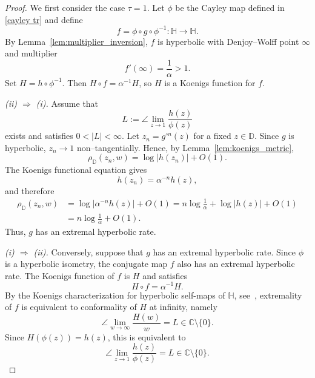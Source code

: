 \documentclass[12pt]{amsart}
\numberwithin{equation}{section}
\theoremstyle{plain}
\theoremstyle{definition}
\begin{document}
\begin{proof}
We first consider the case $\tau=1$. Let $\phi$ be the Cayley map defined in \eqref{cayley tr}
and define
\begin{equation*}
f=\phi\circ g\circ\phi^{-1}:\mathbb{H}\to\mathbb{H}.
\end{equation*}
By Lemma~\ref{lem:multiplier_inversion}, $f$ is hyperbolic with
Denjoy--Wolff point $\infty$ and multiplier
\begin{equation*}
f'(\infty)=\frac1\alpha>1.
\end{equation*}
Set
$H=h\circ\phi^{-1}.$
Then
$H\circ f=\alpha^{-1}H$,
so $H$ is a Koenigs function for $f$.

\medskip
\noindent\emph{(ii) $\Rightarrow$ (i).}
Assume that
\begin{equation*}
L:=\angle\lim_{z\to1}\frac{h(z)}{\phi(z)}
\end{equation*}
exists and satisfies $0<|L|<\infty$. Let
$z_n=g^{\circ n}(z)$ for a fixed $z\in\mathbb{D}$. Since $g$ is
hyperbolic, $z_n\to1$ non--tangentially. Hence, by
Lemma~\ref{lem:koenigs_metric},
\begin{equation*}
\rho_{\mathbb{D}}(z_n,w)
=
\log|h(z_n)|+O(1).
\end{equation*}
The Koenigs functional equation gives
\begin{equation*}
h(z_n)=\alpha^{-n}h(z),
\end{equation*}
and therefore
\begin{align*}
\rho_{\mathbb{D}}(z_n,w)
&=
\log|\alpha^{-n}h(z)|+O(1)
=
n\log\frac1\alpha+\log|h(z)|+O(1)\\
&=
n\log\frac1\alpha+O(1).
\end{align*}
Thus, $g$ has an extremal hyperbolic rate.

\medskip
\noindent\emph{(i) $\Rightarrow$ (ii).}
Conversely, suppose that $g$ has an extremal hyperbolic rate. Since
$\phi$ is a hyperbolic isometry, the conjugate map $f$ also has an
extremal hyperbolic rate. The Koenigs function of $f$ is $H$ and
satisfies
\begin{equation*}
H\circ f=\alpha^{-1}H.
\end{equation*}
By the Koenigs characterization for hyperbolic self-maps of
$\mathbb{H}$, see~\cite[Theorem~5.2]{cruz}, extremality of $f$ is
equivalent to conformality of $H$ at infinity, namely
\begin{equation*}
\angle\lim_{w\to\infty}\frac{H(w)}{w}
=L
\in\mathbb{C}\setminus\{0\}.
\end{equation*}
Since $H(\phi(z))=h(z)$, this is equivalent to
\begin{equation*}
\angle\lim_{z\to1}\frac{h(z)}{\phi(z)}
=
L
\in\mathbb{C}\setminus\{0\}.
\end{equation*}


\end{proof}
\end{document}
